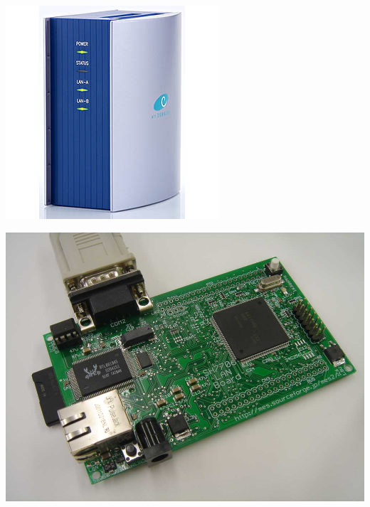 \documentclass[cjk,dvipdfm,12pt]{beamer}
\begin{document}
\begin{frame}
\begin{minipage}[t]{0.3\hsize}
  \includegraphics[width=1.0\hsize]{image200705/lbox.jpg}
 \end{minipage} 
 \begin{minipage}[t]{0.3\hsize}
  \includegraphics[width=1.0\hsize]{image200705/t-sh7706lan.jpg}
 \end{minipage} 
 \begin{minipage}[t]{0.4\hsize}

\end{minipage}
\end{frame}
\end{document}
